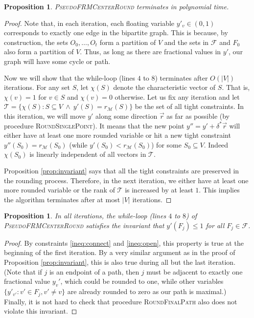 \documentclass[a4paper,11pt]{article}
\newtheorem{proposition}[theorem]{Proposition}
\newcommand{\F}{\mathcal{F}}
\newcommand{\T}{\mathcal{T}}
\newcommand{\M}{\mathcal{M}}
\begin{document}
\begin{proposition} \textsc{PseudoFRMCenterRound} terminates in polynomial time.
\end{proposition}
\begin{proof}
Note that, in each iteration, each floating variable $y'_v \in (0,1)$ corresponds to exactly one edge in the bipartite graph. This is because, by construction, the sets $O_0, \ldots, O_t$ form a partition of $V$ and the sets in $\F$ and $F_0$ also form a partition of $V$. Thus, as long as there are fractional values in $y'$, our graph will have some cycle or path.

Now we will show that the while-loop (lines $4$ to $8$) terminates after $O(|V|)$ iterations. For any set $S$, let $\chi(S)$ denote the characteristic vector of $S$. That is, $\chi(v) = 1$ for $v \in S$ and $\chi(v) = 0$ otherwise. Let us fix any iteration and let $\T = \{\chi(S): S  \subseteq V ~\wedge~ y'(S) = r_\M(S)\}$ be the set of all tight constraints. In this iteration, we will move $y'$ along some direction $\vec{r}$ as far as possible (by procedure \textsc{RoundSinglePoint}). It means that the new point $y'' = y' + \delta^* \vec{r}$ will either have at least one more rounded variable or hit a new tight constraint $y''(S_0) = r_\M(S_0)$ (while $y'(S_0) < r_\M(S_0)$) for some $S_0 \subseteq V$. Indeed $\chi(S_0)$ is linearly independent of all vectors in $\T$. 

Proposition \ref{prop:invariant} says that all the tight constraints are preserved in the rounding process. Therefore, in the next iteration, we either have at least one more rounded variable or the rank of $\T$ is increased by at least $1$. This implies the algorithm terminates after at most $|V|$ iterations.
\end{proof}


\begin{proposition} In all  iterations, the while-loop (lines $4$ to $8$) of \textsc{PseudoFRMCenterRound} satisfies the invariant that $y'(F_j) \leq 1$ for all $F_j \in \F$.
\label{prop:invariant2}
\end{proposition}
\begin{proof}
By constraints \ref{ineq:connect} and \ref{ineq:open}, this property is true at the beginning of the first iteration. By a very similar argument as in the proof of Proposition \ref{prop:invariant}, this is also true during all but the last iteration. (Note that if $j$ is an endpoint of a path, then $j$ must be adjacent to exactly one fractional value $y_v'$, which could be rounded to one, while other variables $\{y'_{v'}: v' \in F_j, v' \neq v\}$ are already rounded to zero as our path is maximal.) Finally, it is not hard to check that procedure \textsc{RoundFinalPath} also does not violate this invariant.
\end{proof}
\end{document}
